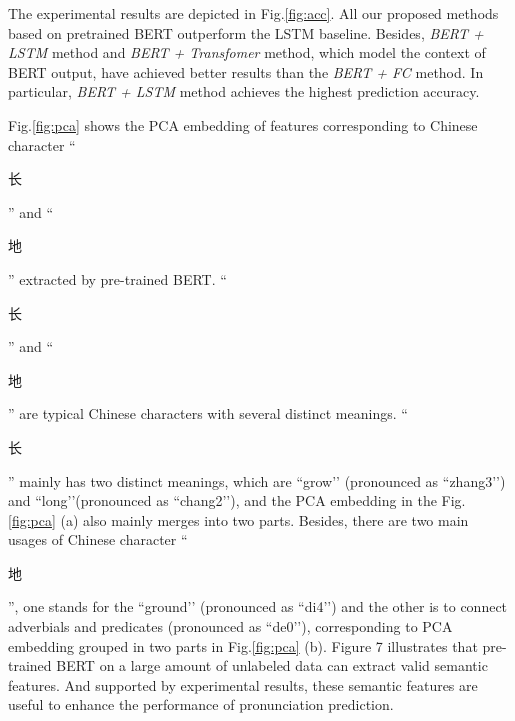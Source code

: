 \documentclass[a4paper]{article}
\begin{document}
%	
%		
%		
%


The experimental results are depicted in Fig.\ref{fig:acc}. All our proposed methods based on pretrained BERT outperform the LSTM baseline. Besides, \textit{BERT + LSTM} method and \textit{ BERT + Transfomer }  method, which model the context of BERT output, have achieved better results than the \textit{BERT + FC} method. In particular, \textit{BERT + LSTM} method achieves the highest prediction accuracy.

Fig.\ref{fig:pca} shows the PCA embedding of features corresponding to Chinese character ``\begin{CJK*}{UTF8}{gbsn}长\end{CJK*}'' and ``\begin{CJK*}{UTF8}{gbsn}地\end{CJK*}'' extracted by pre-trained BERT. ``\begin{CJK*}{UTF8}{gbsn}长\end{CJK*}'' and ``\begin{CJK*}{UTF8}{gbsn}地\end{CJK*}'' are typical Chinese characters with several distinct meanings. ``\begin{CJK*}{UTF8}{gbsn}长\end{CJK*}'' mainly has two distinct meanings, which are ``grow’’ (pronounced as ``zhang3’’) and ``long’’(pronounced as ``chang2’’), and the PCA embedding in the Fig.\ref{fig:pca} (a) also mainly merges into two parts. Besides, there are two main usages of  Chinese character ``\begin{CJK*}{UTF8}{gbsn}地\end{CJK*}'', one stands for the ``ground’’ (pronounced as ``di4’’) and the other is to connect adverbials and predicates (pronounced as ``de0’’), corresponding to PCA embedding grouped in two parts in Fig.\ref{fig:pca} (b). Figure 7 illustrates that pre-trained BERT on a large amount of unlabeled data can extract valid semantic features. And supported by experimental results, these semantic features are useful to enhance the performance of pronunciation prediction.
\end{document}

